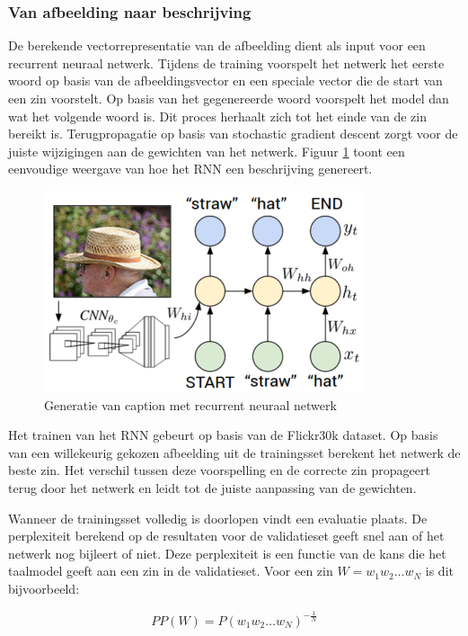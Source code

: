 \subsubsection{Van afbeelding naar beschrijving}
De berekende vectorrepresentatie van de afbeelding dient als input voor een recurrent neuraal netwerk. Tijdens de training voorspelt het netwerk het eerste woord op basis van de afbeeldingsvector en een speciale vector die de start van een zin voorstelt. Op basis van het gegenereerde woord voorspelt het model dan wat het volgende woord is. Dit proces herhaalt zich tot het einde van de zin bereikt is. Terugpropagatie op basis van stochastic gradient descent zorgt voor de juiste wijzigingen aan de gewichten van het netwerk. Figuur \ref{fig:rnntraining} toont een eenvoudige weergave van hoe het RNN een beschrijving genereert.

\begin{figure}[tb]
    \centering
    \includegraphics[width=0.5\linewidth]{Images/karpathy.PNG}
    \caption{Generatie van caption met recurrent neuraal netwerk}
\label{fig:rnntraining}
\end{figure}

Het trainen van het RNN gebeurt op basis van de Flickr30k dataset. 
Op basis van een willekeurig gekozen afbeelding uit de trainingsset berekent het netwerk de beste zin. Het verschil tussen deze voorspelling en de correcte zin propageert terug door het netwerk en leidt tot de juiste aanpassing van de gewichten.

Wanneer de trainingsset volledig is doorlopen vindt een evaluatie plaats. De perplexiteit berekend op de resultaten voor de validatieset geeft snel aan of het netwerk nog bijleert of niet. Deze perplexiteit is een functie van de kans die het taalmodel geeft aan een zin in de validatieset. Voor een zin $W=w_1w_2\dots w_N$ is dit bijvoorbeeld\cite{Jurafsky:2009:SLP:1214993}:

\begin{equation}
PP(W)=P(w_1w_2\dots w_N)^{-\frac{1}{N}}
\end{equation}

